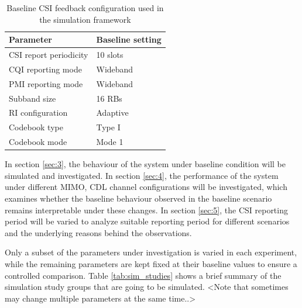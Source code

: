 \documentclass[a4paper,12pt,onecolumn]{article}
\begin{document}
		\begin{table}[H]
			\centering
			\caption{Baseline CSI feedback configuration used in the simulation framework}
			\label{tab:csi_config}
			\begin{tabular}{ll}
				\hline
				\textbf{Parameter} & \textbf{Baseline setting}  \\
				\toprule
				CSI report periodicity      & 10 slots \\
				CQI reporting mode          & Wideband  \\
				PMI reporting mode          & Wideband  \\
				Subband size                & 16 RBs   \\
				RI configuration            & Adaptive \\
				Codebook type               & Type I    \\
				Codebook mode               & Mode 1   \\
				\hline
			\end{tabular}
		\end{table}
		
		
	\begin{highlightblock}
		In section \ref{sec:3}, the behaviour of the system under baseline condition will be simulated and investigated. In section \ref{sec:4}, the performance of the system under different MIMO, CDL channel configurations will be investigated, which examines whether the baseline behaviour observed in the baseline scenario remains interpretable under these changes. In section \ref{sec:5}, the CSI reporting period will be varied to analyze suitable reporting period for different scenarios and the underlying reasons behind the observations. 
		
		Only a subset of the parameters under investigation is varied in each experiment, while the remaining parameters are kept fixed at their baseline values to ensure a controlled comparison. Table \ref{tab:sim_studies} shows a brief summary of the simulation study groups that are going to be simulated. <Note that sometimes may change multiple parameters at the same time..>
	\end{highlightblock}
	
\end{document}
